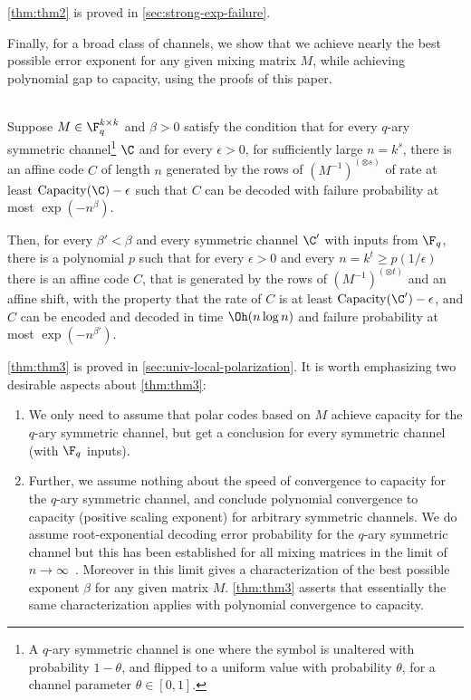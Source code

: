 \documentclass[11pt]{article}
\begin{document}
\cref{thm:thm2} is proved in \cref{sec:strong-exp-failure}. 

Finally, for a broad class of channels, we show that we achieve nearly the best possible error exponent for any given mixing matrix $M$, while achieving polynomial gap to capacity, using the proofs of this paper.

\begin{theorem}
	\label{thm:thm3}
	~\\ Suppose $M\in\F_q^{k \times k}$ and $\beta > 0$ satisfy the condition that for every $q$-ary symmetric channel\footnote{A $q$-ary symmetric channel is one where the symbol is unaltered with probability $1-\theta$, and flipped to a uniform value with probability $\theta$, for a channel parameter $\theta \in [0,1]$.} 
	$\C$ and for every $\epsilon > 0$, for sufficiently large $n=k^s$, there is an affine code $C$ of length $n$ generated by the rows of $(M^{-1})^{(\otimes s)}$ of rate at least $\mathrm{Capacity}(\C)-\epsilon$ such that $C$ can be decoded with failure probability at most $\exp(-n^\beta)$. 
	
	Then, for every $\beta' < \beta$ and every symmetric channel $\C'$ with inputs from $\F_q$, there is a polynomial $p$ such that for every $\epsilon > 0$ and every $n = k^t \geq p(1/\epsilon)$
	there is an affine code $C$, that is generated by the rows of $(M^{-1})^{(\otimes t)}$ and an affine shift, with the property that the rate of $C$ is at least $\mathrm{Capacity}(\C')-\epsilon$, and $C$ can be encoded and decoded in time $\Oh(n \log n)$ and failure probability at most $\exp(-n^{\beta'})$.
\end{theorem}

\cref{thm:thm3} is proved in \cref{sec:univ-local-polarization}. It is worth emphasizing two desirable aspects about \cref{thm:thm3}:
\begin{enumerate}
    \item We only need to assume that polar codes based on $M$ achieve capacity for the $q$-ary symmetric channel, but get a conclusion for every symmetric channel (with $\F_q$ inputs).
    \item Further, we assume nothing about the speed of convergence to capacity for the $q$-ary symmetric channel, and conclude polynomial convergence to capacity (positive scaling exponent) for arbitrary symmetric channels. We do assume root-exponential decoding error probability for the $q$-ary symmetric channel but this has been established for all mixing matrices in the limit of $n\to\infty$~\cite{KSU10,mori-tanaka}. Moreover in this limit \cite{KSU10} gives a characterization of the best possible exponent $\beta$ for any given matrix $M$. \cref{thm:thm3} asserts that essentially the same characterization applies with polynomial convergence to capacity.
\end{enumerate}
\end{document}
